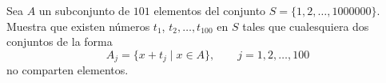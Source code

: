 Sea $A$ un subconjunto de $101$ elementos del conjunto $S=\{1,2,\ldots,1000000\}$. Muestra que existen números $t_1$, $t_2, \ldots, t_{100}$ en $S$ tales que cualesquiera dos conjuntos de la forma \[ A_j=\{x+t_j\mid x\in A\},\qquad j=1,2,\ldots,100 \] no comparten elementos.